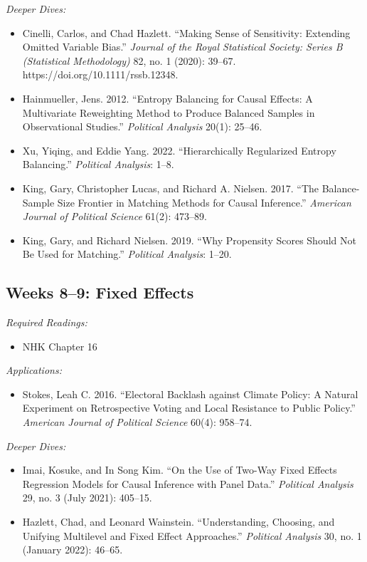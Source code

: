 \documentclass[11pt, letterpaper]{article}
\begin{document}
\noindent \textit{Deeper Dives:}

\begin{itemize}
	\item Cinelli, Carlos, and Chad Hazlett. ``Making Sense of Sensitivity: Extending Omitted Variable Bias.'' \textit{Journal of the Royal Statistical Society: Series B (Statistical Methodology)} 82, no. 1 (2020): 39–67. https://doi.org/10.1111/rssb.12348.
	\item Hainmueller, Jens. 2012. ``Entropy Balancing for Causal Effects: A Multivariate Reweighting Method to Produce Balanced Samples in Observational Studies.'' \textit{Political Analysis} 20(1): 25–46.
	\item Xu, Yiqing, and Eddie Yang. 2022. ``Hierarchically Regularized Entropy Balancing.'' \textit{Political Analysis}: 1–8.
	\item King, Gary, Christopher Lucas, and Richard A. Nielsen. 2017. ``The Balance-Sample Size Frontier in Matching Methods for Causal Inference.'' \textit{American Journal of Political Science} 61(2): 473–89.
	\item King, Gary, and Richard Nielsen. 2019. ``Why Propensity Scores Should Not Be Used for Matching.'' \textit{Political Analysis}: 1–20.
\end{itemize}

\subsection*{Weeks 8--9: Fixed Effects}

\textit{Required Readings:}

\begin{itemize}
	\item NHK Chapter 16
\end{itemize}

\noindent \textit{Applications:}

\begin{itemize}
	\item Stokes, Leah C. 2016. ``Electoral Backlash against Climate Policy: A Natural Experiment on Retrospective Voting and Local Resistance to Public Policy.'' \textit{American Journal of Political Science} 60(4): 958–74.
\end{itemize}

\noindent \textit{Deeper Dives:}

\begin{itemize}
	\item Imai, Kosuke, and In Song Kim. ``On the Use of Two-Way Fixed Effects Regression Models for Causal Inference with Panel Data.'' \textit{Political Analysis} 29, no. 3 (July 2021): 405–15.
	\item Hazlett, Chad, and Leonard Wainstein. ``Understanding, Choosing, and Unifying Multilevel and Fixed Effect Approaches.'' \textit{Political Analysis} 30, no. 1 (January 2022): 46–65.
\end{itemize}
\end{document}
